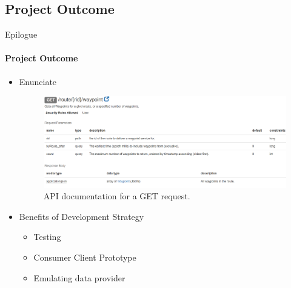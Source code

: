     \subsection{Project Outcome}
    \begin{frame}{Epilogue}\framesubtitle{Project Outcome}   
        \begin{itemize}
            \item<1-> Enunciate
            \begin{figure}[h]
                \centering
                \includegraphics[scale=0.2]{images/enunciate.png}
                \caption{API documentation for a GET request.}
            \end{figure}
            \item<2-> Benefits of Development Strategy
            \begin{itemize}
                \item Testing
                \item Consumer Client Prototype
                \item Emulating data provider
            \end{itemize}

\end{itemize}
\end{frame}
